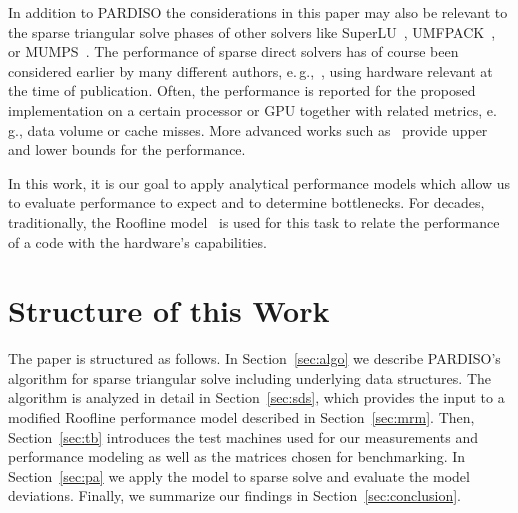 In addition to PARDISO the considerations in this paper
may also be relevant to the sparse triangular solve phases of other
solvers like SuperLU~\cite{li-2005}, UMFPACK~\cite{davis-1997}, or
MUMPS~\cite{amestoy-2000,amestoy-2001,amestoy-2006}.
%
The performance of sparse direct solvers has of course been considered earlier 
by many different authors,
e.\,g.,~\cite{heath-1999,sherry-2008,marrakchi-2017,park-2014,weifeng-2016},
using hardware relevant at the time of publication.
Often, the performance is reported for the proposed implementation on a certain
processor or GPU together with related metrics, e.\,g., data volume or cache
misses.
%
More advanced works such as~\cite{vuduc-2002} provide upper and lower bounds for the performance. 

In this work, it is our goal to apply analytical performance models which
allow us to evaluate
performance to expect and to determine bottlenecks.  
For decades,
traditionally, the Roofline
model~\cite{callahan88,hockney89,schoenauer00,williams-2009} is used
for this task 
to relate the performance of a code with the
hardware's capabilities.


\section*{Structure of this Work}

The paper is structured as follows. 
In Section~\ref{sec:algo} we describe PARDISO's algorithm for sparse triangular solve
including underlying data structures.
The algorithm is analyzed in detail in Section~\ref{sec:sds}, 
which provides the
input to a modified Roofline performance model described in Section~\ref{sec:mrm}. 
Then, Section~\ref{sec:tb} introduces the test machines used for
our
measurements and
performance modeling as well as the matrices chosen for benchmarking.
In Section~\ref{sec:pa} we apply the model to sparse solve and evaluate the model
deviations. 
Finally, we summarize our findings in Section~\ref{sec:conclusion}.

